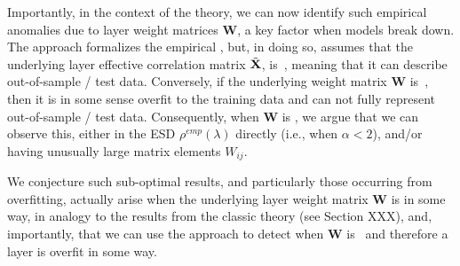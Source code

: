 Importantly, in the context of the \SETOL theory, we can now identify such empirical anomalies
due to \ATypical layer weight matrices $\mathbf{W}$, a key factor when models break down.
The \SETOL approach formalizes the empirical \HTSR \Phenomenology,
but, in doing so, assumes that the
underlying layer effective correlation matrix $\tilde{\mathbf{X}}$, is~\Typical, meaning that it can describe out-of-sample / test data.
Conversely, if the underlying weight matrix $\mathbf{W}$ is~\ATypical, then it is in some sense
overfit to the  training data and can not fully represent out-of-sample / test data.
Consequently, when $\mathbf{W}$ is \ATypical,  we argue that we can observe this, either in the ESD $\rho^{emp}(\lambda)$ directly
(i.e., when $\alpha< 2$),
and/or having unusually large matrix elements $W_{ij}$.

We conjecture such sub-optimal results, and particularly those occurring from overfitting, actually
arise when the underlying layer weight matrix $\mathbf{W}$ is \ATypical in some way,
in analogy to the results from the classic \SMOG theory (see Section XXX),
and, importantly, that we can use the \SETOL approach to detect when $\mathbf{W}$ is~\ATypical
and therefore a layer is overfit in some way.


